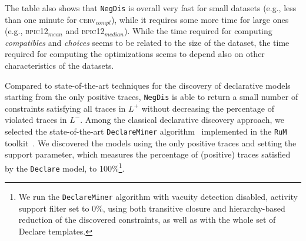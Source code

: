 \documentclass[a4wide,11pt]{article}
\theoremstyle{definition}
\theoremstyle{plain}
\newcommand{\nd}{\texttt{NegDis}\xspace}
\newcommand{\declare}{\texttt{Declare}\xspace}
\newcommand{\rum}{\texttt{RuM}\xspace}
\newcommand{\declareminer}{\texttt{DeclareMiner}\xspace}
\newcommand\dec[1]{$\mathsf{#1}$}
\newcommand\para[1]{\textnormal{\textsf{#1}}}
\begin{document}
The table also shows that \nd is overall very fast for small datasets (e.g., less than one minute for \textsc{cerv$_{compl}$}), while it requires some more time for large ones (e.g., \textsc{bpic12$_{mean}$} and \textsc{bpic12$_{median}$}). While the time required for computing \textit{compatibles} and \textit{choices} seems to be related to the size of the dataset, the time required for computing the optimizations seems to depend also on other characteristics of the datasets. 



Compared to state-of-the-art techniques for the discovery of declarative models starting from the only positive traces, \nd is able to return a small number of constraints satisfying all traces in $L^+$ without decreasing the percentage of violated traces in $L^-$.  
Among the classical declarative discovery approach, we selected the state-of-the-art \declareminer algorithm~\cite{2018a-Maggi} implemented in the \rum toolkit~\cite{2020-Alman}. We discovered the models using the only positive traces and setting the \para{support} parameter, which measures the percentage of (positive) traces satisfied by the \declare model, to 100\%\footnote{We run the \declareminer algorithm with vacuity detection disabled, \para{activity support filter} set to 0\%, using both transitive closure and hierarchy-based reduction of the discovered constraints, as well as with the whole set of Declare templates.}.
\end{document}

